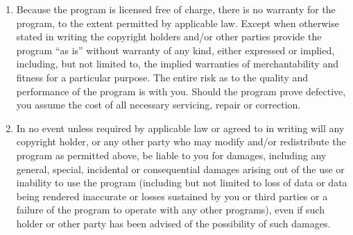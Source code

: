 \documentclass[12pt,openany,a4paper]{book}
\begin{document}
{\begin{enumerate}
\begin{center}
{\Large\sc
No Warranty
}
\end{center}

\item
{\sc Because the program is licensed free of charge, there is no warranty
for the program, to the extent permitted by applicable law.  Except when
otherwise stated in writing the copyright holders and/or other parties
provide the program ``as is'' without warranty of any kind, either expressed
or implied, including, but not limited to, the implied warranties of
merchantability and fitness for a particular purpose.  The entire risk as
to the quality and performance of the program is with you.  Should the
program prove defective, you assume the cost of all necessary servicing,
repair or correction.}

\item
{\sc In no event unless required by applicable law or agreed to in writing
will any copyright holder, or any other party who may modify and/or
redistribute the program as permitted above, be liable to you for damages,
including any general, special, incidental or consequential damages arising
out of the use or inability to use the program (including but not limited
to loss of data or data being rendered inaccurate or losses sustained by
you or third parties or a failure of the program to operate with any other
programs), even if such holder or other party has been advised of the
possibility of such damages.}

\end{enumerate}
}
\end{document}
